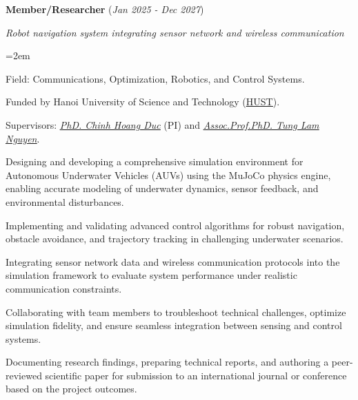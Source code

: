 \documentclass[10pt]{article}
\let\oldhref\href
\renewcommand{\href}[2]{\oldhref{#1}{\ul{#2}}}
\newlength{\skilllabelwidth}
\newcommand{\skill}[2]{%
	\noindent
	\parbox[t]{\skilllabelwidth}{\raggedright\textbf{#1}}%
	\hspace{0.75em}%
	\parbox[t]{\dimexpr\linewidth-\skilllabelwidth-0.75em\relax}{%
		\setlength{\baselineskip}{1.35\baselineskip}%
		#2%
	}\par\vspace{0.7em} %
}
\newcommand{\project}[4]{%
	\noindent \textbf{#1} (\textit{#2})\par
	\vspace{0.5em}
	\noindent \textit{\vspace{0.15cm}#3}\par
	\vspace{0.5em}
	\noindent\hangindent=2em\hangafter=0 #4 \par\normalsize
}
\begin{document}
		\project{Member/Researcher}{Jan 2025 - Dec 2027}{Robot navigation system integrating sensor network and wireless communication}
		{\begin{soloitemize}
				\item Field: Communications, Optimization, Robotics, and Control Systems.
				\item Funded by Hanoi University of Science and Technology (\href{https://hust.edu.vn/en/}{HUST}).
				\item Supervisors: \href{https://scholar.google.com/citations?user=mI561CkAAAAJ&hl=en}{\textit{PhD. Chinh Hoang Duc}} (PI)
				and 
				\href{https://scholar.google.com/citations?user=MlJ_2-wAAAAJ&hl=en}{\textit{Assoc.Prof.PhD. Tung Lam Nguyen}}.
				\item Designing and developing a comprehensive simulation environment for Autonomous Underwater Vehicles (AUVs) using the MuJoCo physics engine, enabling accurate modeling of underwater dynamics, sensor feedback, and environmental disturbances.
				\item Implementing and validating advanced control algorithms for robust navigation, obstacle avoidance, and trajectory tracking in challenging underwater scenarios.
				\item Integrating sensor network data and wireless communication protocols into the simulation framework to evaluate system performance under realistic communication constraints.
				\item Collaborating with team members to troubleshoot technical challenges, optimize simulation fidelity, and ensure seamless integration between sensing and control systems.
				\item Documenting research findings, preparing technical reports, and authoring a peer-reviewed scientific paper for submission to an international journal or conference based on the project outcomes.
		\end{soloitemize}
		}

	
%	
%	
%	
%	
%	
%	
	
\end{document}

